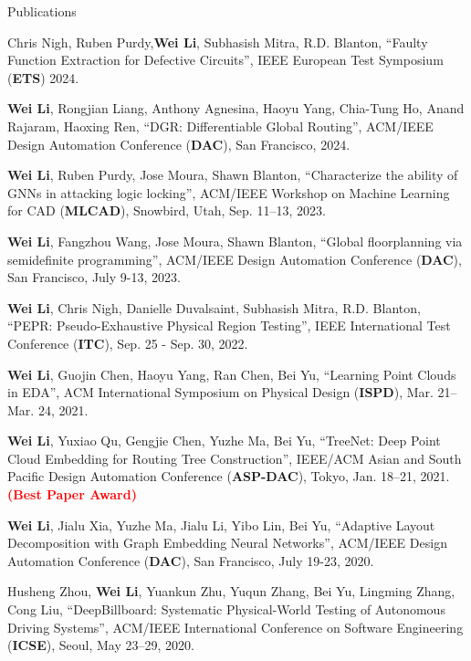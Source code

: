 \begin{rSection}{Publications}
\begin{description}[font=\normalfont]
\item[{[C14]}]{
    Chris Nigh, Ruben Purdy,\textbf{Wei Li}, Subhasish Mitra, R.D. Blanton, ``Faulty Function Extraction for Defective Circuits”, IEEE European Test Symposium (\textbf{ETS}) 2024.
}


    \item[{[C13]}]{
        \textbf{Wei Li}, Rongjian Liang, Anthony Agnesina, Haoyu Yang, Chia-Tung Ho, Anand Rajaram, Haoxing Ren, 
        ``DGR: Differentiable Global Routing'', ACM/IEEE Design Automation Conference (\textbf{DAC}), San Francisco, 2024. 
    }

\item[{[C12]}]{
    \textbf{Wei Li}, Ruben Purdy, Jose Moura, Shawn Blanton, 
    ``Characterize the ability of GNNs in attacking logic locking'', ACM/IEEE Workshop on Machine Learning for CAD (\textbf{MLCAD}), Snowbird, Utah, Sep. 11–13, 2023. 
}
    \item[{[C11]}]{
        \textbf{Wei Li},  Fangzhou Wang, Jose Moura, Shawn Blanton, 
        ``Global floorplanning via semidefinite programming'', ACM/IEEE Design Automation Conference (\textbf{DAC}), San Francisco, July 9-13, 2023.
    }
\item[{[C10]}]{
    \textbf{Wei Li}, Chris Nigh, Danielle Duvalsaint, Subhasish Mitra, R.D. Blanton, 
    ``PEPR: Pseudo-Exhaustive Physical Region Testing'', IEEE International Test Conference (\textbf{ITC}), Sep. 25 - Sep. 30, 2022.
}
\item[{[C9]}]{
    \textbf{Wei Li}, Guojin Chen, Haoyu Yang, Ran Chen, Bei Yu,
    ``Learning Point Clouds in EDA'', 
    ACM International Symposium on Physical Design (\textbf{ISPD}), Mar. 21–Mar. 24, 2021.
}
\item[{[C8]}]{
    \textbf{Wei Li}, Yuxiao Qu, Gengjie Chen, Yuzhe Ma, Bei Yu,
    ``TreeNet: Deep Point Cloud Embedding for Routing Tree Construction'', 
    IEEE/ACM Asian and South Pacific Design Automation Conference (\textbf{ASP-DAC}), Tokyo, Jan. 18–21, 2021. \textcolor{red}{\textbf{(Best Paper Award)}}
}
\item[{[C7]}]{
    \textbf{Wei Li}, Jialu Xia, Yuzhe Ma, Jialu Li, Yibo Lin, Bei Yu, 
    ``Adaptive Layout Decomposition with Graph Embedding Neural Networks'', 
    ACM/IEEE Design Automation Conference (\textbf{DAC}), San Francisco, July 19-23, 2020.
}
\item[{[C6]}]{
    Husheng Zhou, \textbf{Wei Li}, Yuankun Zhu, Yuqun Zhang, Bei Yu, Lingming Zhang, Cong Liu, 
    ``DeepBillboard: Systematic Physical-World Testing of Autonomous Driving Systems'', ACM/IEEE International Conference on Software Engineering (\textbf{ICSE}), Seoul, May 23–29, 2020.
}
\end{description}
\end{rSection}
